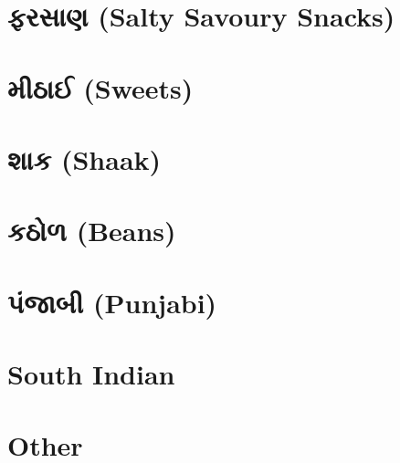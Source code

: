 \documentclass[a4paper, 12pt, oneside]{book}
\newenvironment{gujarati}{\begin{otherlanguage}{gujarati}}{\end{otherlanguage}}
\begin{document}
\begin{gujarati}

\part{ફરસાણ (Salty Savoury Snacks)}




\part{મીઠાઈ (Sweets)}



\part{શાક (Shaak)}




\part{કઠોળ (Beans)}






\part{પંજાબી (Punjabi)}




\part{South Indian}



\part{Other}



\end{gujarati}
\end{document}
